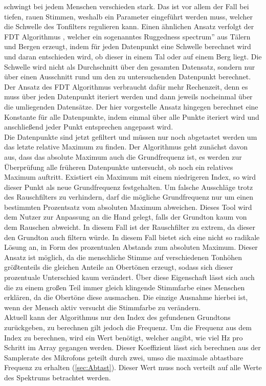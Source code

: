 schwingt bei jedem Menschen verschieden stark. Das ist vor allem der Fall bei tiefen, rauen Stimmen, weshalb ein Parameter 
eingeführt werden muss, welcher die Schwelle des Tonfilters regulieren kann. Einen ähnlichen Ansatz verfolgt der FDT Algorithmus \cite{yazama2005simple}, welcher ein sogenanntes \glqq Ruggedness spectrum'' aus Tälern und Bergen erzeugt, indem für jeden Datenpunkt eine Schwelle berechnet wird und daran entschieden wird, ob dieser in einem Tal oder auf einem Berg liegt. Die Schwelle wird nicht als Durchschnitt über den gesamten Datensatz, sondern nur über einen Ausschnitt rund um den zu untersuchenden Datenpunkt berechnet. Der Ansatz des FDT Algorithmus verbraucht dafür mehr Rechenzeit, denn es muss über jeden Datenpunkt iteriert werden und dann jeweils nocheinmal über die umliegenden Datensätze. Der hier vorgestelle Ansatz hingegen berechnet eine Konstante für alle Datenpunkte, indem einmal über alle Punkte iteriert wird und anschließend jeder Punkt entsprechen angepasst wird. \\
Die Datenpunkte sind jetzt gefiltert und müssen nur noch abgetastet werden um das letzte relative Maximum zu finden. Der Algorithmus geht zunächst davon aus, dass das absolute Maximum auch die Grundfrequenz ist, es werden zur Überprüfung alle früheren Datenpunkte untersucht, ob noch ein relatives Maximum auftritt. Existiert ein Maximum mit einem niedrigeren Index, so wird dieser Punkt als neue Grundfrequenz festgehalten. Um falsche Ausschläge trotz des Rauschfilters zu verhindern, darf die mögliche Grundfrequenz nur um einen bestimmten Prozentsatz vom absoluten Maximum abweichen. Dieses Tool wird dem Nutzer zur Anpassung an die Hand gelegt, falls der Grundton kaum von dem Rauschen abweicht. In diesem Fall ist der Rauschfilter zu extrem, da dieser den Grundton auch filtern würde. In diesem Fall bietet sich eine nicht so radikale Lösung an, in Form des prozentualen Abstands zum absoluten Maximum. Dieser Ansatz ist möglich, da die menschliche Stimme auf verschiedenen Tonhöhen größtenteils die gleichen Anteile an Obertönen erzeugt, sodass sich dieser prozentuale Unterschied kaum verändert. Über diese Eigenschaft lässt sich auch die zu einem großen Teil immer gleich klingende Stimmfarbe eines Menschen erklären, da die Obertöne diese ausmachen. Die einzige Ausnahme hierbei ist, wenn der Mensch aktiv versucht die Stimmfarbe zu verändern. \\
Aktuell kann der Algorithmus nur den Index des gefundenen Grundtons zurückgeben, zu berechnen gilt jedoch die Frequenz. Um die Frequenz aus dem Index zu berechnen, wird ein Wert benötigt, welcher angibt, wie viel Hz pro Schritt im Array gegangen werden. Dieser Koeffizient lässt sich berechnen aus der Samplerate des Mikrofons geteilt durch zwei, umso die maximale abtastbare Frequenz zu erhalten (\ref{sec:Abtast}). Dieser Wert muss noch verteilt auf alle Werte des Spektrums betrachtet werden.
